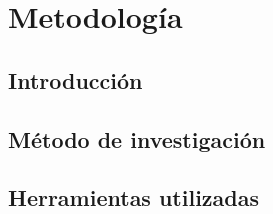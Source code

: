 \chapter{Metodología}\label{ch:metodologia}
\section{Introducción}\label{sec:introduccion_metodologia}
\lipsum[1]

\section{Método de investigación}\label{sec:investigacion_metodologia}
\lipsum[1-3]

\section{Herramientas utilizadas}\label{sec:herramientas_metodologia}
\lipsum[2-5]
